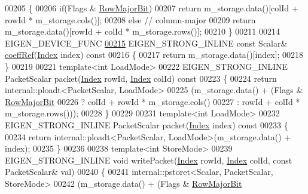 \begin{DoxyCode}
00205 \textcolor{keyword}{    }\{
00206       \textcolor{keywordflow}{if}(Flags & \hyperlink{group__flags_gae4f56c2a60bbe4bd2e44c5b19cbe8762}{RowMajorBit})
00207         \textcolor{keywordflow}{return} m\_storage.data()[colId + rowId * m\_storage.cols()];
00208       \textcolor{keywordflow}{else} \textcolor{comment}{// column-major}
00209         \textcolor{keywordflow}{return} m\_storage.data()[rowId + colId * m\_storage.rows()];
00210     \}
00211 
00214     EIGEN\_DEVICE\_FUNC
\hyperlink{class_eigen_1_1_plain_object_base_a982b56223d011e2f836a3408983883d4}{00215}     EIGEN\_STRONG\_INLINE \textcolor{keyword}{const} Scalar& \hyperlink{class_eigen_1_1_plain_object_base_a982b56223d011e2f836a3408983883d4}{coeffRef}(\hyperlink{namespace_eigen_a62e77e0933482dafde8fe197d9a2cfde}{Index} index)\textcolor{keyword}{ const}
00216 \textcolor{keyword}{    }\{
00217       \textcolor{keywordflow}{return} m\_storage.data()[index];
00218     \}
00219 
00221     \textcolor{keyword}{template}<\textcolor{keywordtype}{int} LoadMode>
00222     EIGEN\_STRONG\_INLINE PacketScalar packet(\hyperlink{namespace_eigen_a62e77e0933482dafde8fe197d9a2cfde}{Index} rowId, \hyperlink{namespace_eigen_a62e77e0933482dafde8fe197d9a2cfde}{Index} colId)\textcolor{keyword}{ const}
00223 \textcolor{keyword}{    }\{
00224       \textcolor{keywordflow}{return} internal::ploadt<PacketScalar, LoadMode>
00225                (m\_storage.data() + (Flags & \hyperlink{group__flags_gae4f56c2a60bbe4bd2e44c5b19cbe8762}{RowMajorBit}
00226                                    ? colId + rowId * m\_storage.cols()
00227                                    : rowId + colId * m\_storage.rows()));
00228     \}
00229 
00231     \textcolor{keyword}{template}<\textcolor{keywordtype}{int} LoadMode>
00232     EIGEN\_STRONG\_INLINE PacketScalar packet(\hyperlink{namespace_eigen_a62e77e0933482dafde8fe197d9a2cfde}{Index} index)\textcolor{keyword}{ const}
00233 \textcolor{keyword}{    }\{
00234       \textcolor{keywordflow}{return} internal::ploadt<PacketScalar, LoadMode>(m\_storage.data() + index);
00235     \}
00236 
00238     \textcolor{keyword}{template}<\textcolor{keywordtype}{int} StoreMode>
00239     EIGEN\_STRONG\_INLINE \textcolor{keywordtype}{void} writePacket(\hyperlink{namespace_eigen_a62e77e0933482dafde8fe197d9a2cfde}{Index} rowId, \hyperlink{namespace_eigen_a62e77e0933482dafde8fe197d9a2cfde}{Index} colId, \textcolor{keyword}{const} PacketScalar& val)
00240     \{
00241       internal::pstoret<Scalar, PacketScalar, StoreMode>
00242               (m\_storage.data() + (Flags & \hyperlink{group__flags_gae4f56c2a60bbe4bd2e44c5b19cbe8762}{RowMajorBit}

\end{DoxyCode}
